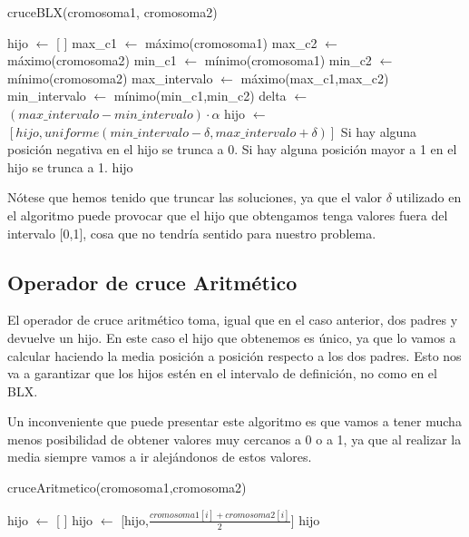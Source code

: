\documentclass[12pt,a4paper]{article}
\begin{document}
	\begin{algorithm}
		\caption{cruceBLX(cromosoma1, cromosoma2)}
		\begin{algorithmic}
			\STATE hijo $\leftarrow$ [ ]
			\STATE max\_c1 $\leftarrow$ máximo(cromosoma1)
			\STATE max\_c2 $\leftarrow$ máximo(cromosoma2)
			\STATE min\_c1 $\leftarrow$ mínimo(cromosoma1)
			\STATE min\_c2 $\leftarrow$ mínimo(cromosoma2)
			\STATE max\_intervalo $\leftarrow$ máximo(max\_c1,max\_c2)
			\STATE min\_intervalo $\leftarrow$ mínimo(min\_c1,min\_c2)
			\STATE delta $\leftarrow$ $(max\_intervalo-min\_intervalo)\cdot \alpha$
				\STATE hijo $\leftarrow$ $[hijo,uniforme(min\_intervalo - \delta, max\_intervalo + \delta)]$
			\ENDFOR
			\STATE Si hay alguna posición negativa en el hijo se trunca a 0.
			\STATE Si hay alguna posición mayor a 1 en el hijo se trunca a 1.
			\RETURN hijo
		\end{algorithmic}
	\end{algorithm}

	Nótese que hemos tenido que truncar las soluciones, ya que el valor $\delta$ utilizado en el algoritmo puede provocar que el hijo que obtengamos tenga valores fuera del intervalo [0,1], cosa que no tendría sentido para nuestro problema.

	\subsection{Operador de cruce Aritmético}

	El operador de cruce aritmético toma, igual que en el caso anterior, dos padres y devuelve un hijo. En este caso el hijo que obtenemos es único, ya que lo vamos a calcular haciendo la media posición a posición respecto a los dos padres. Esto nos va a garantizar que los hijos estén en el intervalo de definición, no como en el BLX.

	Un inconveniente que puede presentar este algoritmo es que vamos a tener mucha menos posibilidad de obtener valores muy cercanos a 0 o a 1, ya que al realizar la media siempre vamos a ir alejándonos de estos valores.

	\begin{algorithm}
		\caption{cruceAritmetico(cromosoma1,cromosoma2)}
		\begin{algorithmic}
			\STATE hijo $\leftarrow$ [ ]
			\FOR{i=0 , ... , longitud(cromosoma1)}
				\STATE hijo $\leftarrow$ [hijo,$\frac{cromosoma1[i]+cromosoma2[i]}{2}$]
			\ENDFOR
			\RETURN hijo
		\end{algorithmic}
	\end{algorithm}
\end{document}
